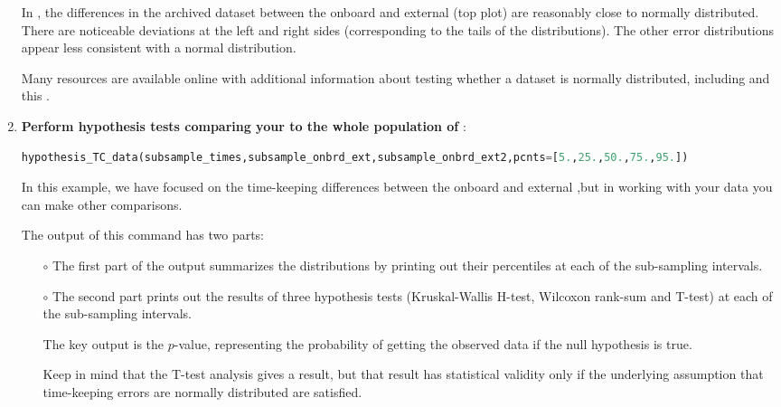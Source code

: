 \begin{enumerate}
	
	In , the differences in the archived dataset between the onboard and external \rtcs (top plot) are reasonably close to normally distributed.
	There are noticeable deviations at the left and right sides (corresponding to the tails of the distributions). 
	The other error distributions appear less consistent with a normal distribution.
	
	Many resources are available online with additional information about testing whether a dataset is normally distributed, including  and this .
	
	 

	\item \textbf{Perform hypothesis tests comparing your \rtc to the whole population of \rtcs}:
\begin{lstlisting}[language=Python]
hypothesis_TC_data(subsample_times,subsample_onbrd_ext,subsample_onbrd_ext2,pcnts=[5.,25.,50.,75.,95.])
\end{lstlisting}
	In this example, we have focused on the time-keeping differences between the onboard and external \rtcs,but in working with your data you can make other comparisons.

	\smallskip
	The output of this command has two parts:
	\begin{itemize}
		\item[$\circ$] The first part of the output summarizes the distributions by printing out their percentiles at each of the sub-sampling intervals.
		\item[$\circ$] The second part prints out the results of three hypothesis tests (Kruskal-Wallis H-test, Wilcoxon rank-sum and T-test) at each of the sub-sampling intervals.
		
		\smallskip
		The key output is the $p$-value, representing the probability of getting the observed data if the null hypothesis is true.
		
		\smallskip
		Keep in mind that the T-test analysis gives a result, but that result has statistical validity only if the underlying assumption that time-keeping errors are normally distributed are satisfied.
	\end{itemize}

\end{enumerate}


